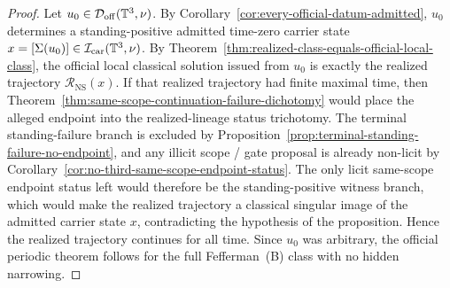 \begin{proof}
Let $u_0\in\mathcal D_{\mathrm{off}}(\mathbb{T}^3,\nu)$. By Corollary~\ref{cor:every-official-datum-admitted},
$u_0$ determines a standing-positive admitted time-zero carrier state
$x=[\Sigma(u_0)]\in\mathcal I_{\mathrm{car}}(\mathbb{T}^3,\nu)$. By
Theorem~\ref{thm:realized-class-equals-official-local-class}, the official local classical solution
issued from $u_0$ is exactly the realized trajectory $\mathcal R_{\mathrm{NS}}(x)$. If that realized trajectory had finite maximal time, then Theorem~\ref{thm:same-scope-continuation-failure-dichotomy} would place the alleged endpoint into the realized-lineage status trichotomy. The terminal standing-failure branch is excluded by Proposition~\ref{prop:terminal-standing-failure-no-endpoint}, and any illicit scope / gate proposal is already non-licit by Corollary~\ref{cor:no-third-same-scope-endpoint-status}. The only licit same-scope endpoint status left would therefore be the standing-positive witness branch, which would make the realized trajectory a classical singular image of the admitted carrier state $x$, contradicting the hypothesis of the proposition. Hence the realized trajectory continues for all time. Since $u_0$ was arbitrary, the official periodic theorem follows for the full Fefferman~(B) class with no hidden narrowing.
\end{proof}



